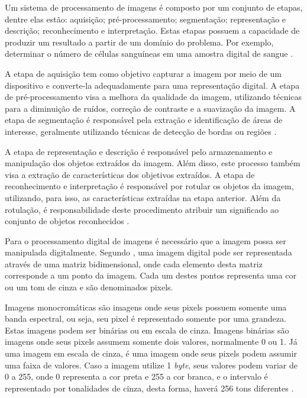\documentclass[
	12pt,				%
	oneside,			%
	a4paper,			%
	english,			%
	french,				%
	spanish,			%
	brazil,				%
	]{abntex2}
\begin{document}
Um sistema de processamento de imagens é composto por um conjunto de etapas, dentre elas estão: aquisição; pré-processamento; segmentação; representação e descrição; reconhecimento e interpretação. Estas etapas possuem a capacidade de produzir um resultado a partir de um domínio do problema. Por exemplo, determinar o número de células sanguíneas em uma amostra digital de sangue \cite{pedriniSchwartz:2008}.

A etapa de aquisição tem como objetivo capturar a imagem por meio de um dispositivo e converte-la adequadamente para uma representação digital. A etapa de pré-processamento visa a melhora da qualidade da imagem, utilizando técnicas para a diminuição de ruídos, correção de contraste e a suavização da imagem. A etapa de segmentação é responsável pela extração e identificação de áreas de interesse, geralmente utilizando técnicas de detecção de bordas ou regiões \cite{pedriniSchwartz:2008}.

A etapa de representação e descrição é responsável pelo armazenamento e manipulação dos objetos extraídos da imagem. Além disso, este processo também visa a extração de características dos objetivos extraídos. A etapa de reconhecimento e interpretação é responsável por rotular os objetos da imagem, utilizando, para isso, as características extraídas na etapa anterior. Além da rotulação, é responsabilidade deste procedimento atribuir um significado ao conjunto de objetos reconhecidos \cite{pedriniSchwartz:2008}. 

Para o processamento digital de imagens é necessário que a imagem possa ser manipulada digitalmente. Segundo \citet{pedriniSchwartz:2008}, uma imagem digital pode ser representada através de uma matriz bidimensional, onde cada elemento desta matriz corresponde a um ponto da imagem. Cada um destes pontos representa uma cor ou um tom de cinza e são denominados pixels. 

Imagens monocromáticas são imagens onde seus pixels possuem somente uma banda espectral, ou seja, seu pixel é representado somente por uma grandeza. Estas imagens podem ser binárias ou em escala de cinza. Imagens binárias são imagens onde seus pixels assumem somente dois valores, normalmente 0 ou 1. Já uma imagem em escala de cinza, é uma imagem onde seus pixels podem assumir uma faixa de valores. Caso a imagem utilize 1 \textit{byte}, seus valores podem variar de 0 a 255, onde 0 representa a cor preta e 255 a cor branca, e o intervalo é representado por tonalidades de cinza, desta forma, haverá 256 tons diferentes \cite{conciAzevedoLeta:2008}.
\end{document}
